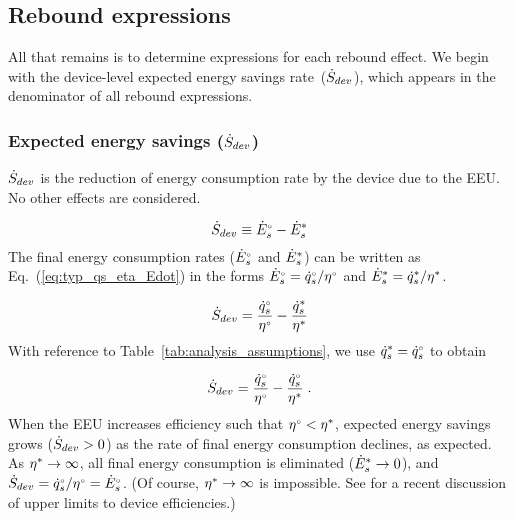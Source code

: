 












\subsection{Rebound expressions}
\label{sec:rebound_expressions}

All that remains is to determine expressions for each rebound effect.
We begin with the device-level expected energy savings rate~($\dot{S}_{dev}$), which
appears in the denominator of all rebound expressions.


\subsubsection{Expected energy savings ($\dot{S}_{dev}$)}
\label{sec:Sdot}

$\dot{S}_{dev}$ is the reduction of energy consumption rate
by the device due to the EEU.
No other effects are considered.

\begin{equation} \label{eq:S_dot_def}
  \dot{S}_{dev} \equiv {}{\dot{E}}^{\scriptscriptstyle \circ}_s - {\dot{E}}^*_s
\end{equation}
%
The final energy consumption rates (${}{\dot{E}}^{\scriptscriptstyle \circ}_s$ and ${\dot{E}}^*_s$)
can be written as Eq.~(\ref{eq:typ_qs_eta_Edot}) in the forms
${}{\dot{E}}^{\scriptscriptstyle \circ}_s = {}{\dot{q}}^{\scriptscriptstyle \circ}_s/{}{\eta}^{\scriptscriptstyle \circ}$ and
${\dot{E}}^*_s = {\dot{q}}^*_s/{\eta}^*$.

\begin{equation}
  \dot{S}_{dev} = \frac{{}{\dot{q}}^{\scriptscriptstyle \circ}_s}{{}{\eta}^{\scriptscriptstyle \circ}} - \frac{{\dot{q}}^*_s}{{\eta}^*}
\end{equation}
%
With reference to Table~\ref{tab:analysis_assumptions},
we use ${\dot{q}}^*_s = {}{\dot{q}}^{\scriptscriptstyle \circ}_s$ to obtain

\begin{equation}
  \dot{S}_{dev} = \frac{{}{\dot{q}}^{\scriptscriptstyle \circ}_s}{{}{\eta}^{\scriptscriptstyle \circ}} - \frac{{}{\dot{q}}^{\scriptscriptstyle \circ}_s}{{\eta}^*} \; .
\end{equation}
%
When the EEU increases efficiency such that
${}{\eta}^{\scriptscriptstyle \circ} < {\eta}^*$,
expected energy savings grows ($\dot{S}_{dev} > 0$)
as the rate of final energy consumption declines,
as expected.
As ${\eta}^* \rightarrow \infty$,
all final energy consumption is eliminated (${\dot{E}}^*_s \rightarrow 0$), and
$\dot{S}_{dev} = {}{\dot{q}}^{\scriptscriptstyle \circ}_s/{}{\eta}^{\scriptscriptstyle \circ} = {}{\dot{E}}^{\scriptscriptstyle \circ}_s$.
(Of course, ${\eta}^* \rightarrow \infty$ is impossible.
See \citet{Paoli:2020aa} for a recent discussion of upper limits to device efficiencies.)

